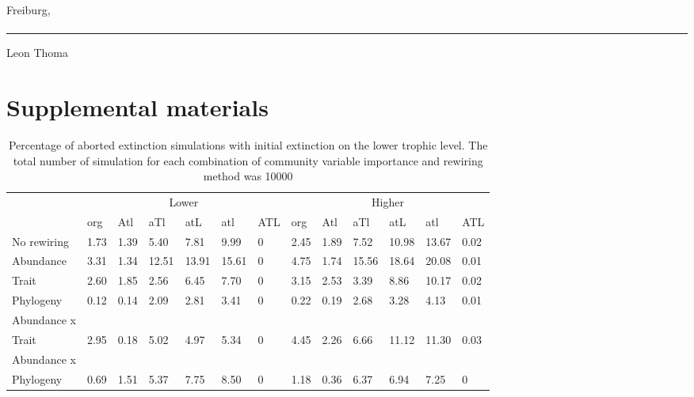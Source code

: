 \documentclass[12pt,a4paper]{article}
\begin{document}
Freiburg,\paragraph{}

\rule{5cm}{.4pt}\par
Leon Thoma
\newpage
\section{Supplemental materials}
\begin{landscape}
\begin{table}[H]
\centering
\captionsetup{width = .7\linewidth}
\caption{Percentage of aborted extinction simulations with initial extinction on the lower trophic level. The total number of simulation for each combination of community variable importance and rewiring method was 10000}
\label{tab:abort_perc}
\begin{tabularx}{.7\linewidth}{lllllllllllll}
\toprule
  & \multicolumn{6}{c}{Lower} & \multicolumn{6}{c}{Higher} \\ \cmidrule(l){2-7} \cmidrule(l){8-13}
 & org & Atl & aTl & atL & atl & ATL & org & Atl & aTl & atL & atl & ATL \\ \midrule
No rewiring & 1.73 & 1.39 & 5.40 & 7.81 & 9.99 & 0 & 2.45 & 1.89 & 7.52 & 10.98 & 13.67 & 0.02  \\
Abundance & 3.31 & 1.34 & 12.51 & 13.91 & 15.61 & 0 & 4.75 & 1.74 & 15.56 & 18.64 & 20.08 & 0.01 \\
Trait & 2.60 & 1.85 & 2.56 & 6.45 & 7.70 & 0 & 3.15 & 2.53 & 3.39 & 8.86 & 10.17 & 0.02 \\
Phylogeny & 0.12 & 0.14 & 2.09 & 2.81 & 3.41 & 0 & 0.22 & 0.19 & 2.68 & 3.28 & 4.13 & 0.01 \\
Abundance x \\ Trait & 2.95 & 0.18 & 5.02 & 4.97 & 5.34 & 0 & 4.45 & 2.26 & 6.66 & 11.12 & 11.30 & 0.03 \\
Abundance x \\ Phylogeny & 0.69 & 1.51 & 5.37 & 7.75 & 8.50 & 0 & 1.18 & 0.36 & 6.37 & 6.94 & 7.25 & 0 \\ \bottomrule
\end{tabularx}%
\end{table}
\end{landscape}
\end{document}
